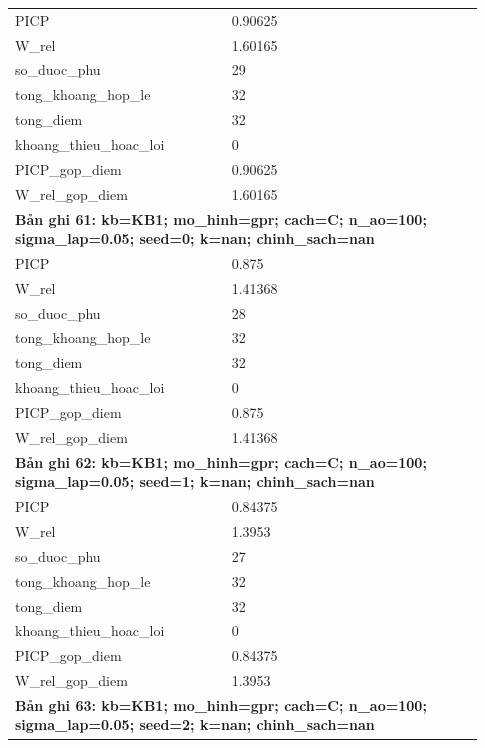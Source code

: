 \begin{longtable}{p{0.43\linewidth}p{0.50\linewidth}}
PICP & 0.90625 \\
W\_\allowbreak rel & 1.60165 \\
so\_\allowbreak duoc\_\allowbreak phu & 29 \\
tong\_\allowbreak khoang\_\allowbreak hop\_\allowbreak le & 32 \\
tong\_\allowbreak diem & 32 \\
khoang\_\allowbreak thieu\_\allowbreak hoac\_\allowbreak loi & 0 \\
PICP\_\allowbreak gop\_\allowbreak diem & 0.90625 \\
W\_\allowbreak rel\_\allowbreak gop\_\allowbreak diem & 1.60165 \\
\midrule
\multicolumn{2}{p{0.95\linewidth}}{\textbf{Bản ghi 61: kb=KB1; mo\_hinh=gpr; cach=C; n\_ao=100; sigma\_lap=0.05; seed=0; k=nan; chinh\_sach=nan}} \\
PICP & 0.875 \\
W\_\allowbreak rel & 1.41368 \\
so\_\allowbreak duoc\_\allowbreak phu & 28 \\
tong\_\allowbreak khoang\_\allowbreak hop\_\allowbreak le & 32 \\
tong\_\allowbreak diem & 32 \\
khoang\_\allowbreak thieu\_\allowbreak hoac\_\allowbreak loi & 0 \\
PICP\_\allowbreak gop\_\allowbreak diem & 0.875 \\
W\_\allowbreak rel\_\allowbreak gop\_\allowbreak diem & 1.41368 \\
\midrule
\multicolumn{2}{p{0.95\linewidth}}{\textbf{Bản ghi 62: kb=KB1; mo\_hinh=gpr; cach=C; n\_ao=100; sigma\_lap=0.05; seed=1; k=nan; chinh\_sach=nan}} \\
PICP & 0.84375 \\
W\_\allowbreak rel & 1.3953 \\
so\_\allowbreak duoc\_\allowbreak phu & 27 \\
tong\_\allowbreak khoang\_\allowbreak hop\_\allowbreak le & 32 \\
tong\_\allowbreak diem & 32 \\
khoang\_\allowbreak thieu\_\allowbreak hoac\_\allowbreak loi & 0 \\
PICP\_\allowbreak gop\_\allowbreak diem & 0.84375 \\
W\_\allowbreak rel\_\allowbreak gop\_\allowbreak diem & 1.3953 \\
\midrule
\multicolumn{2}{p{0.95\linewidth}}{\textbf{Bản ghi 63: kb=KB1; mo\_hinh=gpr; cach=C; n\_ao=100; sigma\_lap=0.05; seed=2; k=nan; chinh\_sach=nan}} \\

\end{longtable}
